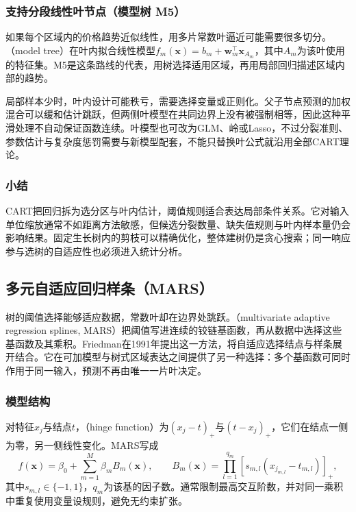\subsubsection{支持分段线性叶节点（模型树 M5）}
\label{sec:regression-model-tree}

如果每个区域内的价格趋势近似线性，用多片常数叶逼近可能需要很多切分。（model tree）在叶内拟合线性模型$f_m(\bm{x})=b_m+\bm{w}_m^{\top}\bm{x}_{A_m}$，其中$A_m$为该叶使用的特征集。M5是这条路线的代表，用树选择适用区域，再用局部回归描述区域内部的趋势。

局部样本少时，叶内设计可能秩亏，需要选择变量或正则化。父子节点预测的加权混合可以缓和估计跳跃，但两侧叶模型在共同边界上没有被强制相等，因此这种平滑处理不自动保证函数连续。叶模型也可改为GLM、岭或Lasso，不过分裂准则、参数估计与复杂度惩罚需要与新模型配套，不能只替换叶公式就沿用全部CART理论。

\subsubsection{小结}

CART把回归拆为选分区与叶内估计，阈值规则适合表达局部条件关系。它对输入单位缩放通常不如距离方法敏感，但候选分裂数量、缺失值规则与叶内样本量仍会影响结果。固定生长树内的剪枝可以精确优化，整体建树仍是贪心搜索；同一响应参与选树的自适应性也必须进入统计分析。

\subsection{多元自适应回归样条（MARS）}
\label{sec:regression-mars}

树的阈值选择能够适应数据，常数叶却在边界处跳跃。（multivariate adaptive regression splines, MARS）把阈值写进连续的铰链基函数，再从数据中选择这些基函数及其乘积。Friedman在1991年提出这一方法，将自适应选择结点与样条展开结合。它在可加模型与树式区域表达之间提供了另一种选择：多个基函数可同时作用于同一输入，预测不再由唯一一片叶决定。

\subsubsection{模型结构}

对特征$x_j$与结点$t$，（hinge function）为$(x_j-t)_+$与$(t-x_j)_+$，它们在结点一侧为零，另一侧线性变化。MARS写成
\begin{equation}
  f(\bm{x})=\beta_0+\sum_{m=1}^{M}\beta_m B_m(\bm{x}),
  \qquad
  B_m(\bm{x})=\prod_{l=1}^{q_m}
                 [s_{m,l}(x_{j_{m,l}}-t_{m,l})]_+,
  \label{eq:regression-mars}
\end{equation}
其中$s_{m,l}\in\{-1,1\}$，$q_m$为该基的因子数。通常限制最高交互阶数，并对同一乘积中重复使用变量设规则，避免无约束扩张。

